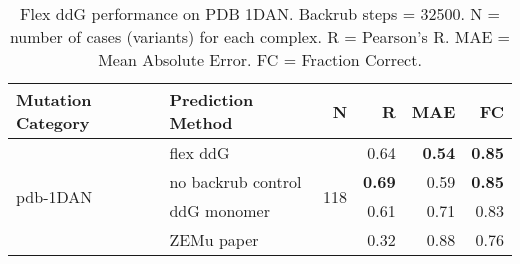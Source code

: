 \begin{table}
  \begin{tabular}{llrrrr}
\toprule
Mutation Category &   Prediction Method &    N &    R &  MAE &   FC \\
\midrule
 \multirow{ 4}{*}{pdb-1DAN} & flex ddG & \multirow{ 4}{*}{118} & 0.64 & \textbf{0.54} & \textbf{0.85}  \\
 & no backrub control & & \textbf{0.69} & 0.59 & \textbf{0.85}  \\
 & ddG monomer & & 0.61 & 0.71 & 0.83  \\
 & ZEMu paper & & 0.32 & 0.88 & 0.76  \\
\bottomrule
\end{tabular}
  \caption[Flex ddG performance on PDB 1DAN]{
    Flex ddG performance on PDB 1DAN. Backrub steps = 32500. N = number of cases (variants) for each complex. R = Pearson's R. MAE = Mean Absolute Error. FC = Fraction Correct.
  } \label{tab:table-pdb-1DAN}
\end{table}
